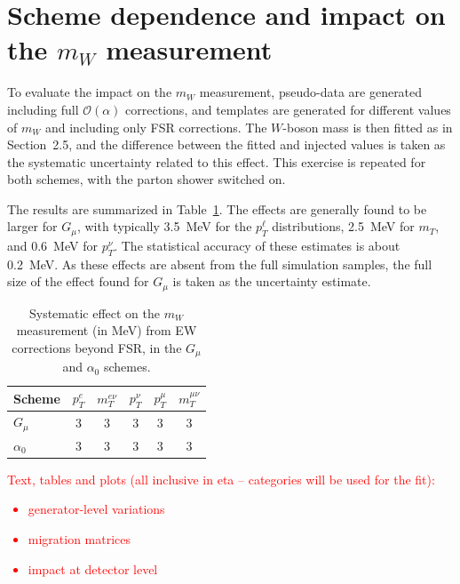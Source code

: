 \section{Scheme dependence and impact on the \texorpdfstring{$m_W$}{mW}
measurement}

To evaluate the impact on the $m_W$ measurement, pseudo-data are generated
including full $\mathcal{O}(\alpha)$ corrections, and templates are generated
for different values of $m_W$ and including only FSR corrections. The
$W$-boson mass is then fitted as in Section~2.5, and the difference between
the fitted and injected values is taken as the systematic uncertainty related
to this effect. This exercise is repeated for both schemes, with the parton
shower switched on.

The results are summarized in Table~\ref{tab:ew-beyond-fsr}. The effects are generally found to be
larger for $G_\mu$, with typically 3.5~MeV for the $p_T^\ell$
distributions, 2.5~MeV for $m_T$, and 0.6~MeV for $p_T^\nu$. The statistical
accuracy of these estimates is about 0.2~MeV. As these effects are absent from
the full simulation samples, the full size of the effect found for $G_\mu$ is
taken as the uncertainty estimate.

\begin{table}[htbp]
  \centering
  \caption{Systematic effect on the $m_W$ measurement (in MeV) from EW
  corrections beyond FSR, in the $G_\mu$ and $\alpha_0$ schemes.}
  \label{tab:ew-beyond-fsr}
  \begin{tabular}{lccccc}
    \toprule
    Scheme & $p_T^e$ & $m_T^{e\nu}$ & $p_T^\nu$ & $p_T^\mu$
           & $m_T^{\mu\nu}$ \\
    \midrule
    $G_\mu$    & 3 & 3 & 3       & 3 & 3 \\
    $\alpha_0$ & 3& 3 & $3$   & 3 & 3 \\
    \bottomrule
  \end{tabular}
\end{table}


\textcolor{red}{Text, tables and plots (all inclusive in eta -- categories will be used for the fit):
\begin{itemize}
\item generator-level variations
\item migration matrices
\item impact at detector level
\end{itemize}}

